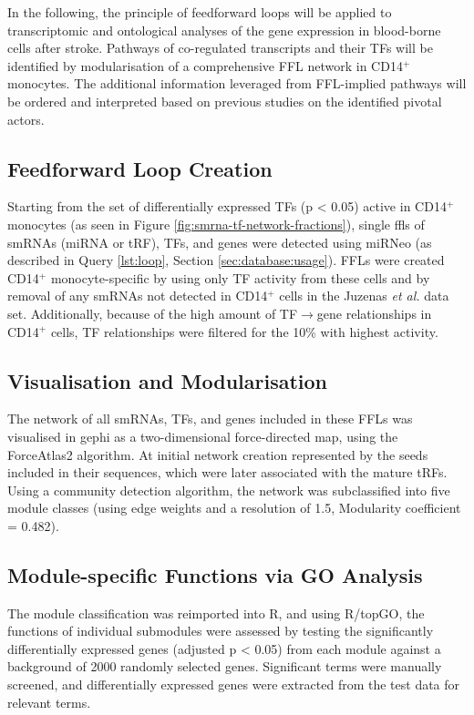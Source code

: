 In the following, the principle of feedforward loops will be applied to transcriptomic and ontological analyses of the gene expression in blood-borne cells after stroke. Pathways of co-regulated transcripts and their TFs will be identified by modularisation of a comprehensive FFL network in CD14$^+$ monocytes. The additional information leveraged from FFL-implied pathways will be ordered and interpreted based on previous studies on the identified pivotal actors.

\begin{method}

\subsection{Feedforward Loop Creation}
Starting from the set of differentially expressed TFs (p < 0.05) active in CD14$^+$ monocytes (as seen in Figure \ref{fig:smrna-tf-network-fractions}), single \acfp{ffl} of smRNAs (miRNA or tRF), TFs, and genes were detected using miRNeo (as described in Query \ref{lst:loop}, Section \ref{sec:database:usage}). FFLs were created CD14$^+$ monocyte-specific by using only TF activity from these cells and by removal of any smRNAs not detected in CD14$^+$ cells in the Juzenas \emph{et al.}\cite{Juzenas2017} data set. Additionally, because of the high amount of TF$\to$gene relationships in CD14$^+$ cells, TF relationships were filtered for the 10\% with highest activity.

\subsection{Visualisation and Modularisation}
The network of all smRNAs, TFs, and genes included in these FFLs was visualised in gephi\cite{Jacomy2014} as a two-dimensional force-directed map, using the ForceAtlas2 algorithm. At initial network creation represented by the seeds included in their sequences, which were later associated with the mature tRFs. Using a community detection algorithm\cite{Blondel2008}, the network was subclassified into five module classes (using edge weights and a resolution of 1.5, Modularity coefficient = 0.482).

\subsection{Module-specific Functions via GO Analysis}
 The module classification was reimported into R, and using R/topGO,\cite{Alexa2006} the functions of individual submodules were assessed by testing the significantly differentially expressed genes (adjusted p < 0.05) from each module against a background of 2000 randomly selected genes. Significant terms were manually screened, and differentially expressed genes were extracted from the test data for relevant terms.

\end{method}

